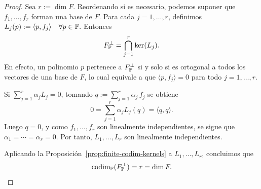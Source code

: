 \begin{proof}
	Sea $r:=\dim F$. Reordenando si es necesario, podemos suponer que $f_1,\dots,f_r$ forman una base de $F$. Para cada $j=1,\dots,r$, definimos $L_j(p):=\langle p,f_j\rangle\quad\forall p\in\mathbb{P}.$ Entonces
	\[
		F^{\perp}_{\mathbb{P}}=\bigcap_{j=1}^r \ker(L_j).
	\]
	En efecto, un polinomio $p$ pertenece a $F^{\perp}_{\mathbb{P}}$ si y solo si es ortogonal a todos los vectores de una base de $F$, lo cual equivale a que $\langle p,f_j\rangle=0$ para todo $j=1,\dots,r$.

	Si $\sum_{j=1}^r \alpha_j L_j=0$, tomando
	\(
	q:=\sum_{j=1}^r \overline{\alpha_j}\,f_j
	\)
	se obtiene
	\[
		0=\sum_{j=1}^r \alpha_j L_j(q)=\langle q,q\rangle.
	\]
	Luego $q=0$, y como $f_1,\dots,f_r$ son linealmente independientes, se sigue que $\alpha_1=\cdots=\alpha_r=0$. Por tanto, $L_1,\dots,L_r$ son linealmente independientes.

	Aplicando la Proposición~\ref{prop:finite-codim-kernels} a $L_1,\dots,L_r$, concluimos que
	\[
		\operatorname{codim}_{\mathbb{P}}(F^{\perp}_{\mathbb{P}})=r=\dim F.
	\]
\end{proof}

